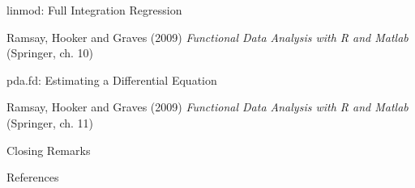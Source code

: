 \documentclass[compress]{beamer}
\begin{document}

\begin{frame}{linmod:  Full Integration Regression}

Ramsay, Hooker and Graves (2009)
\emph{Functional Data Analysis with R and Matlab}
(Springer, ch. 10)

\end{frame}

\begin{frame}{pda.fd:  Estimating a Differential Equation}

Ramsay, Hooker and Graves (2009)
\emph{Functional Data Analysis with R and Matlab}
(Springer, ch. 11)

\end{frame}
\begin{frame}{Closing Remarks}

\end{frame}

\begin{frame}{References}




\end{frame}
\end{document}

